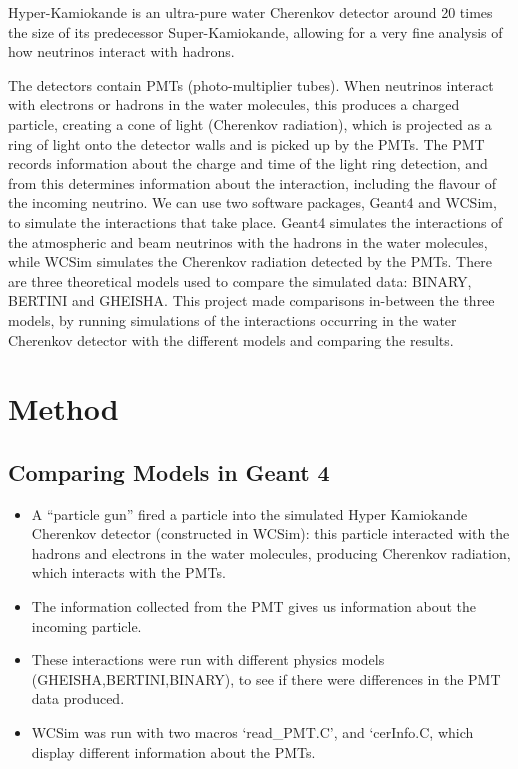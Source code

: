 \documentclass[a0,portrait]{a0poster}
\begin{document}
\begin{multicols}{2}
 Hyper-Kamiokande is an ultra-pure water Cherenkov detector around 20 times the size of its predecessor Super-Kamiokande, allowing for a very fine analysis of how neutrinos interact with hadrons. \par
The detectors contain PMTs (photo-multiplier tubes). When neutrinos interact with electrons or hadrons in the water molecules, this produces a charged particle, creating a cone of light (Cherenkov radiation), which is projected as a ring of light onto the detector walls and is picked up by the PMTs. The PMT records information about the charge and time of the light ring detection, and from this determines information about the interaction, including the flavour of the incoming neutrino. We can use two software packages, Geant4 and WCSim, to simulate the interactions that take place. Geant4 simulates the interactions of the atmospheric and beam neutrinos with the hadrons in the water molecules, while WCSim simulates the Cherenkov radiation detected by the PMTs. There are three theoretical models used to compare the simulated data: BINARY, BERTINI and GHEISHA. \cite{models} This project made comparisons in-between the three models, by running simulations of the interactions occurring in the water Cherenkov detector with the different models and comparing the results.
\color{VioletRed3}
\section*{Method}
\subsection*{Comparing Models in Geant 4}
\begin{itemize}
\item A “particle gun” fired a particle into the simulated Hyper Kamiokande Cherenkov detector (constructed in WCSim): this particle interacted with the hadrons and electrons in the water molecules, producing Cherenkov radiation, which interacts with the PMTs.
\item The information collected from the PMT gives us information about the incoming particle.
\item These interactions were run with different physics models (GHEISHA,BERTINI,BINARY), to see if there were differences in the PMT data produced.
\item WCSim was run with two macros `read\_PMT.C', and `cerInfo.C, which display different information about the PMTs.
\end{itemize}


\end{multicols}
\end{document}
